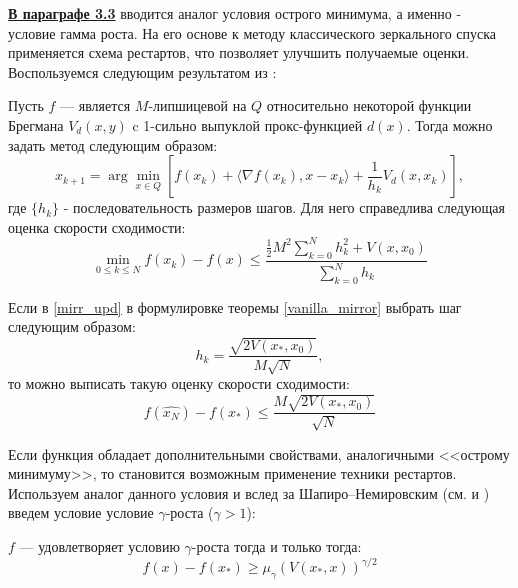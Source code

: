 \underline{\textbf{В параграфе 3.3}} вводится аналог условия острого минимума, а именно - условие гамма роста. На его основе к методу классического зеркального спуска применяется схема рестартов, что позволяет улучшить получаемые оценки.
Воспользуемся следующим результатом из \cite{Lu_2018}:
\begin{theorem} \label{vanilla_mirror}
    Пусть $f$ --- является $M$-липшицевой на $Q$ относительно некоторой функции Брегмана $V_d(x, y)$ c 1-сильно выпуклой прокс-функцией $d(x)$. Тогда можно задать метод следующим образом:
    \begin{equation} \label{mirr_upd}
        x_{k+1} = \arg \min_{x \in Q} {\left[ f(x_k) + \langle \nabla f(x_k), x - x_k \rangle + \frac{1}{h_k} V_d(x, x_k)\right]},
    \end{equation}
    где $\{ h_k \}$ - последовательность размеров шагов.
    Для него справедлива следующая оценка скорости сходимости:
    \begin{equation} \label{general_est}
        \min_{0\leq k \leq N} f(x_k) - f(x) \leq \frac{\frac{1}{2} M^2 \sum_{k=0}^N h_k^2 + V(x, x_0)}{\sum_{k=0}^N h_k}
    \end{equation}
\end{theorem}


\begin{remark}
    Если в \eqref{mirr_upd} в формулировке теоремы \ref{vanilla_mirror} выбрать шаг следующим образом:
    \begin{equation} \label{mirr_step}
        h_{k} = \frac{\sqrt{2 V(x_*, x_0)}}{M\sqrt{N}},
    \end{equation}
    то можно выписать такую оценку скорости сходимости:
    \begin{equation} \label{mirr_est}
        f(\widehat{x_N}) - f(x_*) \leq \frac{M\sqrt{2V(x_*, x_0)}}{\sqrt{N}}
    \end{equation}
\end{remark}
Если функция обладает дополнительными свойствами, аналогичными <<острому минимуму>>,  то становится возможным применение техники рестартов. Используем аналог данного условия и вслед за Шапиро–Немировским (см. \cite{shapiro_2005} и \cite{shapiro_2021} ) введем  условие условие $\gamma$-роста ($\gamma > 1$):
\begin{definition}
   $f$ --- удовлетворяет условию $\gamma$-роста тогда и только тогда:
   \begin{equation} \label{gamma-growth}
       f(x) - f(x_*) \geq \mu_{\gamma}(V(x_*,x))^{\gamma/2}
   \end{equation}
\end{definition}

